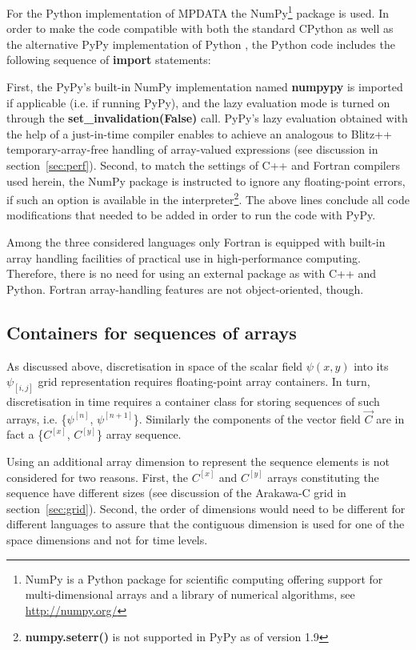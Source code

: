 \documentclass[gmd]{copernicus}%
\newcounter{lstnopyt}
\newcounter{linenopyt}
\newcommand*\FancyVerbStartString{}
\newcommand*\FancyVerbStopString{}
\newcommand{\codepyt}[4]{%
  \addtocounter{lstnopyt}{1}%
  \renewcommand*\FancyVerbStartString{\PY{c}{\PYZsh{}#2}}
  \renewcommand*\FancyVerbStopString{\PY{c}{\PYZsh{}#3}}
  \setcounter{FancyVerbLine}{\thelinenopyt}%
  \fvset{label={listing~P.\thelstnopyt~(Python)},rulecolor=\color{blue},stepnumber=#4}%
  \setcounter{linenopyt}{\value{FancyVerbLine}}%
}
\newcommand{\prog}[1]{{\rm\bf#1}}
\begin{document}
  For the Python implementation of MPDATA the NumPy\footnote{NumPy is a Python package
    for scientific computing offering support for multi-dimensional arrays and a library
    of numerical algorithms, see \url{http://numpy.org/}} package is used.
  In order to make the code compatible with both the standard CPython
    as well as the alternative PyPy implementation of Python \citep[][]{Bolz_et_al_2011},
    the Python code includes the following sequence of \prog{import} statements:
  \codepyt{code-pyt-listings.py}{listing02}{listing03}{1}
  First, the PyPy's built-in NumPy implementation named \prog{numpypy} is imported if applicable (i.e. if running PyPy), 
    and the lazy evaluation mode is turned on through the \prog{set\_invalidation(False)} call.
  PyPy's lazy evaluation obtained with the help of a just-in-time compiler enables to achieve
    an analogous to Blitz++ temporary-array-free handling of array-valued expressions 
    (see discussion in section~\ref{sec:perf}).
  Second, to match the settings of C++ and Fortran compilers used herein, the NumPy package is instructed 
    to ignore any floating-point errors, if such an option
    is available in the interpreter\footnote{\prog{numpy.seterr()} is not supported in PyPy as of version 1.9}.
  The above lines conclude all code modifications that needed to be added in order to run
    the code with PyPy.

  Among the three considered languages only Fortran is equipped with built-in
    array handling facilities of practical use in high-performance computing. 
  Therefore, there is no need for using an external package as with C++ and Python.
  Fortran array-handling features are not object-oriented, though.

  \subsection{Containers for sequences of arrays}\label{sec:sequence}

  As discussed above, discretisation in space of the scalar field $\psi(x,y)$ into its $\psi_{[i,j]}$ 
    grid representation requires floating-point array containers.
  In turn, discretisation in time requires a container class for storing
    sequences of such arrays, i.e. \{$\psi^{[n]}$, $\psi^{[n+1]}$\}.
  Similarly the components of the vector field $\vec{C}$ are in fact a \{$C^{[x]}$, $C^{[y]}$\} 
    array sequence.
 
  Using an additional array dimension to represent the sequence elements is not considered for two reasons.
  First, the $C^{[x]}$ and $C^{[y]}$ arrays constituting the sequence have different sizes
    (see discussion of the Arakawa-C grid in section~\ref{sec:grid}).
  Second, the order of dimensions would need to be different for different languages to assure that
    the contiguous dimension is used for one of the space dimensions and not for time levels.
\end{document}
